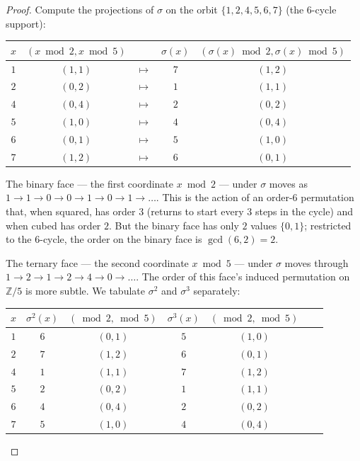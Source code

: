 \documentclass[11pt]{article}
\theoremstyle{plain}
\theoremstyle{definition}
\theoremstyle{remark}
\begin{document}
\begin{proof}
Compute the projections of $\sigma$ on the orbit $\{1, 2, 4, 5, 6, 7\}$ (the $6$-cycle support):

\begin{center}
\begin{tabular}{c|cc|cc}
$x$ & $(x \bmod 2, x \bmod 5)$ & & $\sigma(x)$ & $(\sigma(x) \bmod 2, \sigma(x) \bmod 5)$ \\
\hline
$1$ & $(1, 1)$ & $\mapsto$ & $7$ & $(1, 2)$ \\
$2$ & $(0, 2)$ & $\mapsto$ & $1$ & $(1, 1)$ \\
$4$ & $(0, 4)$ & $\mapsto$ & $2$ & $(0, 2)$ \\
$5$ & $(1, 0)$ & $\mapsto$ & $4$ & $(0, 4)$ \\
$6$ & $(0, 1)$ & $\mapsto$ & $5$ & $(1, 0)$ \\
$7$ & $(1, 2)$ & $\mapsto$ & $6$ & $(0, 1)$
\end{tabular}
\end{center}

The binary face --- the first coordinate $x \bmod 2$ --- under $\sigma$ moves as $1 \to 1 \to 0 \to 0 \to 1 \to 0 \to 1 \to \dots$. This is the action of an order-$6$ permutation that, when squared, has order $3$ (returns to start every $3$ steps in the cycle) and when cubed has order $2$. But the binary face has only $2$ values $\{0, 1\}$; restricted to the $6$-cycle, the order on the binary face is $\gcd(6, 2) = 2$.

The ternary face --- the second coordinate $x \bmod 5$ --- under $\sigma$ moves through $1 \to 2 \to 1 \to 2 \to 4 \to 0 \to \dots$. The order of this face's induced permutation on $\mathbb{Z}/5$ is more subtle. We tabulate $\sigma^2$ and $\sigma^3$ separately:

\begin{center}
\begin{tabular}{c|cc|cc|cc}
$x$ & $\sigma^2(x)$ & $(\bmod 2, \bmod 5)$ & $\sigma^3(x)$ & $(\bmod 2, \bmod 5)$ & & \\
\hline
$1$ & $6$ & $(0, 1)$ & $5$ & $(1, 0)$ & & \\
$2$ & $7$ & $(1, 2)$ & $6$ & $(0, 1)$ & & \\
$4$ & $1$ & $(1, 1)$ & $7$ & $(1, 2)$ & & \\
$5$ & $2$ & $(0, 2)$ & $1$ & $(1, 1)$ & & \\
$6$ & $4$ & $(0, 4)$ & $2$ & $(0, 2)$ & & \\
$7$ & $5$ & $(1, 0)$ & $4$ & $(0, 4)$ & &
\end{tabular}
\end{center}


\end{proof}
\end{document}
